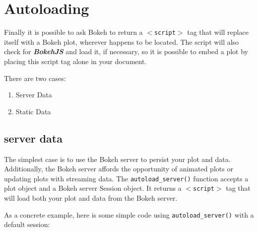 \documentclass[a4paper,12pt]{article}
\begin{document}

\section{Autoloading}
Finally it is possible to ask Bokeh to return a $<$\texttt{script}$>$ tag that will replace itself with a Bokeh plot, wherever happens to be located. The script will also check for \textbf{\textit{BokehJS}} and load it, if necessary, so it is possible to embed a plot by placing this script tag alone in your document.

There are two cases:

\begin{enumerate}
\item Server Data
\item Static Data
\end{enumerate}
\subsection{server data}
The simplest case is to use the Bokeh server to persist your plot and data. Additionally, the Bokeh server affords the opportunity of animated plots or updating plots with streaming data. The \texttt{autoload\_server()} function accepts a plot object and a Bokeh server Session object. It returns a $<$\texttt{script}$>$ tag that will load both your plot and data from the Bokeh server.

As a concrete example, here is some simple code using \texttt{autoload\_server()} with a default session:
\end{document}
